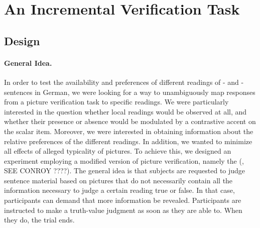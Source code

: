 \documentclass[fleqn,reqno,10pt,draft]{article}
\newcommand{\as}{\acro{as}}
\renewcommand{\es}{\acro{es}}
\begin{document}
\section{An Incremental Verification Task}
\label{sec:exp}

\subsection{Design}
\label{sec:design}

\paragraph{General Idea.} In order to test the availability and
preferences of different readings of \as- and \es-sentences in German, 
we were looking for a way to unambiguously map responses from a picture
verification task to specific readings. We were particularly
interested in the question whether local readings would be observed at
all, and whether their presence or absence would be modulated by
a contrastive accent on the scalar item. Moreover, we were  
interested in obtaining information about the relative preferences 
of the different readings. In addition, we wanted
to minimize all effects of alleged typicality of pictures. To achieve this, we designed an experiment employing a
modified version of picture verification, namely the
 (, SEE CONROY
????). The general idea is that subjects are requested to judge
sentence material based on pictures that do not necessarily contain
all the information necessary to judge a certain reading true or
false. In that case, participants can demand that more information be
revealed. Participants are instructed to make a truth-value judgment
as soon as they are able to. When they do, the trial ends.
\end{document}
